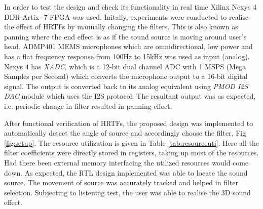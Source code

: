 \documentclass[conference]{IEEEtran}
\begin{document}
In order to test the design and check its functionality in real time Xilinx Nexys 4 DDR Artix -7 FPGA was used. Initally, experiments were conducted to realise the effect of HRTFs by manually changing the filters. This is also known as panning where the end effect is as if the sound source is moving around user's head. ADMP401 MEMS microphones which are omnidirectional, low power and has a flat frequency response from 100Hz to 15kHz was used as input (analog). Nexys 4 has \textit{XADC}, which is a 12-bit dual channel ADC with 1 MSPS (Mega Samples per Second) which converts the microphone output to a 16-bit digital signal. The output is converted back to its analog equivalent using \textit{PMOD I2S DAC} module which uses the I2S protocol. The resultant output was as expected, i.e. periodic change in filter resulted in panning effect.

After functional verification of HRTFs, the proposed design was implemented to automatically detect the angle of source and accordingly choose the filter, Fig \ref{fig:setup}.
The resource utilization is given in Table \ref{tab:resourceuti}. Here all the filter coefficients were directly stored in registers, taking up most of the resources. Had there been external memory interfacing the utilized resources would come down.  As expected, the RTL design implemented was able to locate the sound source. The movement of source was accurately tracked and helped in filter selection. Subjecting to listening test, the user was able to realise the 3D sound effect. \newline
\end{document}
